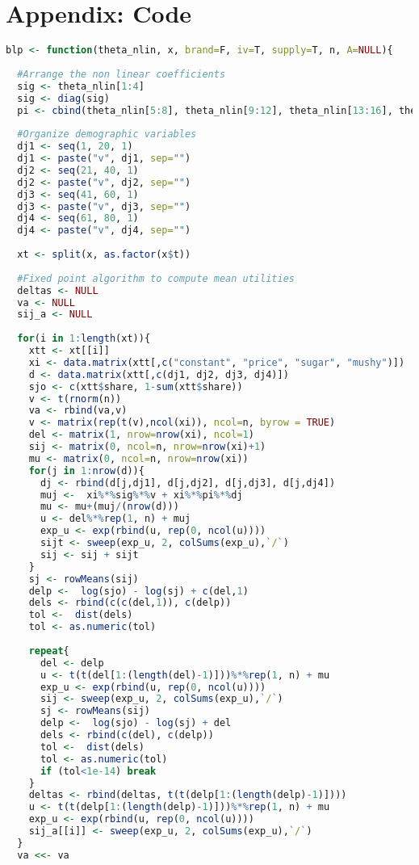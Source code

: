 \documentclass[12pt,english]{article}
\begin{document}
\section{Appendix: Code}

\begin{scriptsize}
\begin{lstlisting}[language=R]
blp <- function(theta_nlin, x, brand=F, iv=T, supply=T, n, A=NULL){
  
  #Arrange the non linear coefficients
  sig <- theta_nlin[1:4]
  sig <- diag(sig)
  pi <- cbind(theta_nlin[5:8], theta_nlin[9:12], theta_nlin[13:16], theta_nlin[17:20])
  
  #Organize demographic variables
  dj1 <- seq(1, 20, 1)
  dj1 <- paste("v", dj1, sep="")
  dj2 <- seq(21, 40, 1)
  dj2 <- paste("v", dj2, sep="")
  dj3 <- seq(41, 60, 1)
  dj3 <- paste("v", dj3, sep="")
  dj4 <- seq(61, 80, 1)
  dj4 <- paste("v", dj4, sep="")
  
  xt <- split(x, as.factor(x$t))
  
  #Fixed point algorithm to compute mean utilities
  deltas <- NULL
  va <- NULL
  sij_a <- NULL
  
  for(i in 1:length(xt)){
    xtt <- xt[[i]]
    xi <- data.matrix(xtt[,c("constant", "price", "sugar", "mushy")])
    d <- data.matrix(xtt[,c(dj1, dj2, dj3, dj4)])
    sjo <- c(xtt$share, 1-sum(xtt$share))
    v <- t(rnorm(n))
    va <- rbind(va,v)
    v <- matrix(rep(t(v),ncol(xi)), ncol=n, byrow = TRUE)
    del <- matrix(1, nrow=nrow(xi), ncol=1)
    sij <- matrix(0, ncol=n, nrow=nrow(xi)+1)
    mu <- matrix(0, ncol=n, nrow=nrow(xi))
    for(j in 1:nrow(d)){
      dj <- rbind(d[j,dj1], d[j,dj2], d[j,dj3], d[j,dj4])
      muj <-  xi%*%sig%*%v + xi%*%pi%*%dj
      mu <- mu+(muj/(nrow(d)))
      u <- del%*%rep(1, n) + muj
      exp_u <- exp(rbind(u, rep(0, ncol(u))))
      sijt <- sweep(exp_u, 2, colSums(exp_u),`/`)
      sij <- sij + sijt
    }
    sj <- rowMeans(sij)
    delp <-  log(sjo) - log(sj) + c(del,1)
    dels <- rbind(c(c(del,1)), c(delp))
    tol <-  dist(dels)
    tol <- as.numeric(tol)
    
    repeat{
      del <- delp
      u <- t(t(del[1:(length(del)-1)]))%*%rep(1, n) + mu
      exp_u <- exp(rbind(u, rep(0, ncol(u))))
      sij <- sweep(exp_u, 2, colSums(exp_u),`/`)
      sj <- rowMeans(sij)
      delp <-  log(sjo) - log(sj) + del
      dels <- rbind(c(del), c(delp))
      tol <-  dist(dels)
      tol <- as.numeric(tol)
      if (tol<1e-14) break
    } 
    deltas <- rbind(deltas, t(t(delp[1:(length(delp)-1)])))
    u <- t(t(delp[1:(length(delp)-1)]))%*%rep(1, n) + mu
    exp_u <- exp(rbind(u, rep(0, ncol(u))))
    sij_a[[i]] <- sweep(exp_u, 2, colSums(exp_u),`/`)
  }
  va <<- va
  

\end{lstlisting}
\end{scriptsize}
\end{document}
